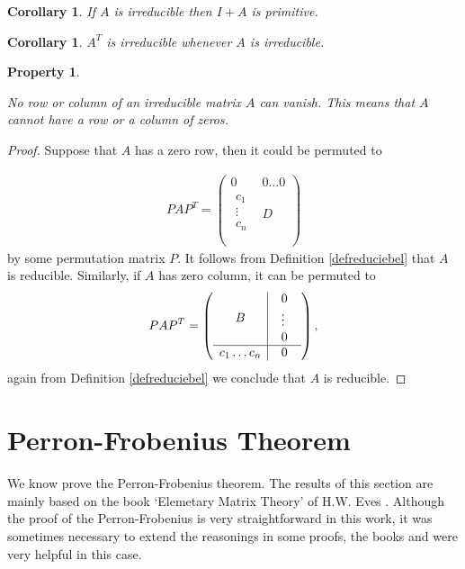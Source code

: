 \documentclass[a4paper,11pt]{report}
\newtheorem{property}[theorem]{Property}
\newtheorem{corollary}[theorem]{Corollary}
\begin{document}
 
 \begin{corollary}

   If $A$ is irreducible then $I+A$ is primitive. 
 \end{corollary}
 \begin{corollary}
   $A^T$ is irreducible whenever $A$ is irreducible.
 \end{corollary}
 \begin{property}\label{geenzerorij}

  No row or column of an irreducible matrix $A$ can vanish. This means that $A$ cannot have a row or a column of zeros.
   \end{property}
 \begin{proof}
   Suppose that $A$ has a zero row, then it could be permuted to
   
\begin{eqnarray*}PAP^T = \left(\begin{array}{c|c}  0 & 0 \ldots 0\\
     \hline
\begin{array}{l}
c_1  \\
\vdots \\
c_n\\   
\end{array}
 & D\\
 \end{array}\right) \end{eqnarray*}
 by some permutation matrix $P$. It follows from Definition \ref{defreduciebel} 
 that $A$ is reducible. Similarly, if $A$ has zero column, it can be permuted 
 to
   $$PAP^T = \left(\begin{array}{c|c} B & \begin{tabular}{l}
0 \\
\vdots \\
0\\   
\end{tabular}\\
\hline
    c_1  \ldots c_n   & 0\\
 \end{array}\right), $$
    again from Definition \ref{defreduciebel} we conclude that $A$ is reducible.

 \end{proof}
 
 
\newpage
 \section{Perron-Frobenius Theorem}
 We know prove the Perron-Frobenius theorem. The results of this section are 
 mainly based on the book `Elemetary Matrix Theory' of H.W. Eves 
 \cite{wngebruikt}. Although the proof of the Perron-Frobenius is very straightforward in this work, it 
 was sometimes necessary to extend the reasonings in some proofs, the books 
 \cite{horn2} and \cite{horn} were very helpful in this case.
 
\end{document}
